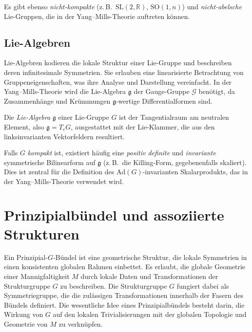 \documentclass[10pt, letterpaper]{article}
\begin{document}
\begin{remark}
Es gibt ebenso \emph{nicht-kompakte} (z.\,B.\ \(\mathrm{SL}(2,\mathbb{R})\), \(\mathrm{SO}(1,n)\)) und \emph{nicht-abelsche} Lie-Gruppen, die in der Yang--Mills-Theorie auftreten können.
\end{remark}

\subsection{Lie-Algebren}
Lie-Algebren kodieren die lokale Struktur einer Lie-Gruppe und beschreiben deren infinitesimale Symmetrien. Sie erlauben eine linearisierte Betrachtung von Gruppeneigenschaften, was ihre Analyse und Darstellung vereinfacht. In der Yang--Mills-Theorie wird die Lie-Algebra \(\mathfrak{g}\) der Gauge-Gruppe \(\mathcal{G}\) benötigt, da Zusammenhänge und Krümmungen \(\mathfrak{g}\)-wertige Differentialformen sind.

\begin{definition}
Die \emph{Lie-Algebra} \(\mathfrak{g}\) einer Lie-Gruppe \(G\) ist der Tangentialraum am neutralen Element, also \(\mathfrak{g} = T_e G\), ausgestattet mit der Lie-Klammer, die aus den linksinvarianten Vektorfeldern resultiert.
\end{definition}

\begin{remark}
Falls \(G\) \emph{kompakt} ist, existiert häufig eine \emph{positiv definite} und \emph{invariante} symmetrische Bilinearform auf \(\mathfrak{g}\) (z.\,B.\ die Killing-Form, gegebenenfalls skaliert). Dies ist zentral für die Definition des \(\mathrm{Ad}(G)\)-invarianten Skalarprodukts, das in der Yang--Mills-Theorie verwendet wird.
\end{remark}

\section{Prinzipialbündel und assoziierte Strukturen}

Ein Prinzipial-\(G\)-Bündel ist eine geometrische Struktur, die lokale Symmetrien in einen konsistenten globalen Rahmen einbettet. Es erlaubt, die globale Geometrie einer Mannigfaltigkeit \(M\) durch lokale Daten und Transformationen der Strukturgruppe \(G\) zu beschreiben. Die Strukturgruppe \(G\) fungiert dabei als Symmetriegruppe, die die zulässigen Transformationen innerhalb der Fasern des Bündels definiert. Die wesentliche Idee eines Prinzipialbündels besteht darin, die Wirkung von \(G\) auf den lokalen Trivialisierungen mit der globalen Topologie und Geometrie von \(M\) zu verknüpfen.
\end{document}
